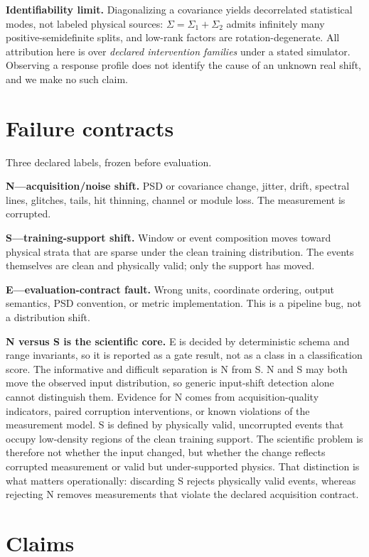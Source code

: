 \documentclass[10pt,twocolumn]{extarticle}
\begin{document}
\textbf{Identifiability limit.} Diagonalizing a covariance yields decorrelated
statistical modes, not labeled physical sources: $\Sigma=\Sigma_1+\Sigma_2$
admits infinitely many positive-semidefinite splits, and low-rank factors are
rotation-degenerate. All attribution here is over \emph{declared intervention
families} under a stated simulator. Observing a response profile does not
identify the cause of an unknown real shift, and we make no such claim.

\section{Failure contracts}

Three declared labels, frozen before evaluation.

\textbf{N---acquisition/noise shift.} PSD or covariance change, jitter, drift,
spectral lines, glitches, tails, hit thinning, channel or module loss. The
measurement is corrupted.

\textbf{S---training-support shift.} Window or event composition moves toward
physical strata that are sparse under the clean training distribution. The
events themselves are clean and physically valid; only the support has moved.

\textbf{E---evaluation-contract fault.} Wrong units, coordinate ordering,
output semantics, PSD convention, or metric implementation. This is a pipeline
bug, not a distribution shift.

\textbf{N versus S is the scientific core.} E is decided by deterministic
schema and range invariants, so it is reported as a gate result, not as a class
in a classification score. The informative and difficult separation is N from
S. N and S may both move the observed input distribution, so generic
input-shift detection alone cannot distinguish them. Evidence for N comes from
acquisition-quality indicators, paired corruption interventions, or known
violations of the measurement model. S is defined by physically valid,
uncorrupted events that occupy low-density regions of the clean training
support. The scientific problem is therefore not whether the input changed, but
whether the change reflects corrupted measurement or valid but under-supported
physics. That distinction is what matters operationally: discarding S rejects
physically valid events, whereas rejecting N removes measurements that violate
the declared acquisition contract.

\section{Claims}
\end{document}
